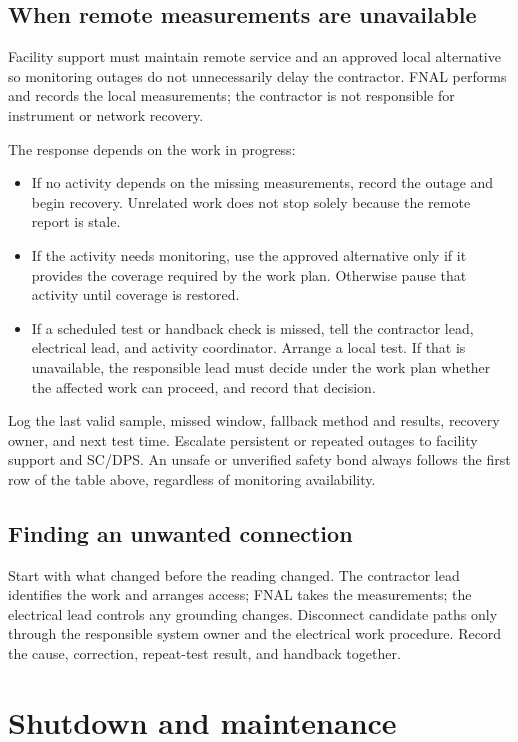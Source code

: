 \documentclass[11pt]{article}
\begin{document}
\subsection{When remote measurements are unavailable}
\label{sec:coverage-response}

Facility support must maintain remote service and an approved local alternative so monitoring outages do not unnecessarily delay the contractor. FNAL performs and records the local measurements; the contractor is not responsible for instrument or network recovery.

The response depends on the work in progress:

\begin{itemize}
  \item If no activity depends on the missing measurements, record the outage and begin recovery. Unrelated work does not stop solely because the remote report is stale.
  \item If the activity needs monitoring, use the approved alternative only if it provides the coverage required by the work plan. Otherwise pause that activity until coverage is restored.
  \item If a scheduled test or handback check is missed, tell the contractor lead, electrical lead, and activity coordinator. Arrange a local test. If that is unavailable, the responsible lead must decide under the work plan whether the affected work can proceed, and record that decision.
\end{itemize}

Log the last valid sample, missed window, fallback method and results, recovery owner, and next test time. Escalate persistent or repeated outages to facility support and SC/DPS. An unsafe or unverified safety bond always follows the first row of the table above, regardless of monitoring availability.

\subsection{Finding an unwanted connection}

Start with what changed before the reading changed. The contractor lead identifies the work and arranges access; FNAL takes the measurements; the electrical lead controls any grounding changes. Disconnect candidate paths only through the responsible system owner and the electrical work procedure. Record the cause, correction, repeat-test result, and handback together.

\section{Shutdown and maintenance}
\end{document}
